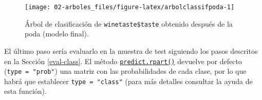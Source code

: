 \documentclass[
]{book}
\newenvironment{Shaded}{\begin{snugshade}}{\end{snugshade}}
\newcommand{\AttributeTok}[1]{\textcolor[rgb]{0.77,0.63,0.00}{#1}}
\newcommand{\CommentTok}[1]{\textcolor[rgb]{0.56,0.35,0.01}{\textit{#1}}}
\newcommand{\FunctionTok}[1]{\textcolor[rgb]{0.00,0.00,0.00}{#1}}
\newcommand{\NormalTok}[1]{#1}
\newcommand{\OtherTok}[1]{\textcolor[rgb]{0.56,0.35,0.01}{#1}}
\newcommand{\SpecialCharTok}[1]{\textcolor[rgb]{0.00,0.00,0.00}{#1}}
\newcommand{\StringTok}[1]{\textcolor[rgb]{0.31,0.60,0.02}{#1}}
\theoremstyle{break}
\theoremstyle{nonumberplain}
\renewcommand{\CommentTok}[1]{\textcolor[rgb]{0.41,0.41,0.41}{\texttt{#1}}}
\begin{document}
\begin{Shaded}
\end{Shaded}

\begin{figure}[!htb]

{\centering \texttt{[image: 02-arboles\_files/figure-latex/arbolclassifpoda-1]} 

}

\caption{Árbol de clasificación de \texttt{winetaste\$taste} obtenido después de la poda (modelo final).}\label{fig:arbolclassifpoda}
\end{figure}

El último paso sería evaluarlo en la muestra de test siguiendo los pasos descritos en la Sección \ref{eval-class}.
El método \href{https://rdrr.io/pkg/rpart/man/predict.rpart.html}{\texttt{predict.rpart()}} devuelve por defecto (\texttt{type\ =\ "prob"}) una matriz con las probabilidades de cada clase, por lo que habrá que establecer \texttt{type\ =\ "class"} (para más detalles consultar la ayuda de esta función).

\begin{Shaded}
\end{Shaded}
\end{document}
